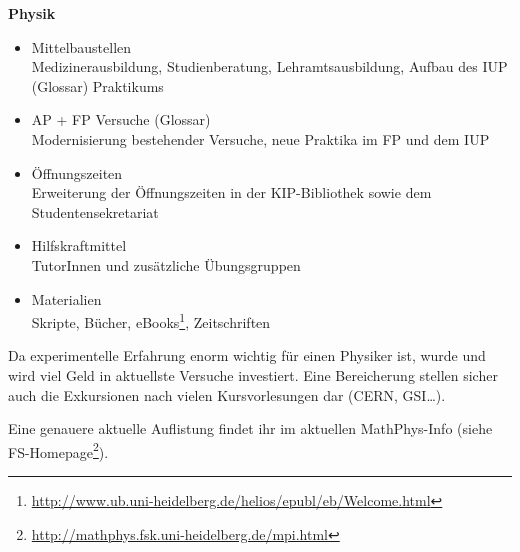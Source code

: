 \vspace{5mm}
\textbf{Physik}
\begin{itemize}
\item {Mittelbaustellen}\\Medizinerausbildung, Studienberatung, Lehramtsausbildung, Aufbau des IUP (Glossar) Praktikums
\item {AP + FP Versuche (Glossar)}\\Modernisierung bestehender Versuche, neue
Praktika im FP und dem IUP
\item {Öffnungszeiten}\\Erweiterung der Öffnungszeiten in der \gls{KIP}-Bibliothek sowie dem Studentensekretariat
\item {Hilfskraftmittel}\\ TutorInnen und zusätzliche Übungsgruppen
\item {Materialien}\\Skripte, Bücher, eBooks\footnote{\url{http://www.ub.uni-heidelberg.de/helios/epubl/eb/Welcome.html}}, Zeitschriften
\end{itemize}

Da experimentelle Erfahrung enorm wichtig für einen Physiker ist, wurde und wird
viel Geld in aktuellste Versuche investiert. Eine Bereicherung stellen sicher auch
die Exkursionen nach vielen Kursvorlesungen dar (CERN, GSI\dots).

Eine genauere aktuelle Auflistung findet ihr im aktuellen MathPhys-Info
(siehe FS-Homepage\footnote{\url{http://mathphys.fsk.uni-heidelberg.de/mpi.html}}).

\vfill
\begin{figure}[h]
\end{figure}
\vfill
